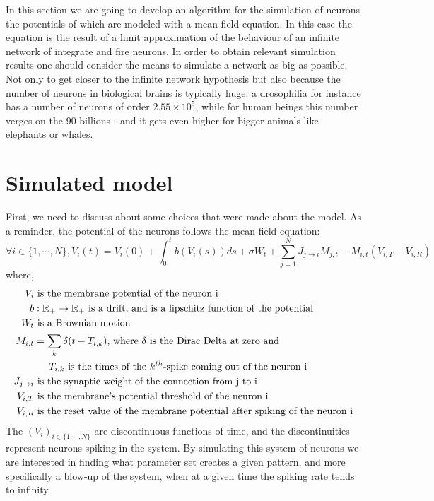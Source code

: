 	\indent In this section we are going to develop an algorithm for the simulation of neurons the potentials of which are modeled with a mean-field equation. In this case the equation is the result of a limit approximation of the behaviour of an infinite network of integrate and fire neurons. In order to obtain relevant simulation results one should consider the means to simulate a network as big as possible. Not only to get closer to the infinite network hypothesis but also because the number of neurons in biological brains is typically huge: a drosophilia for instance has a number of neurons of order $2.55\times10^5$, while for human beings this number verges on the 90 billions - and it gets even higher for bigger animals like elephants or whales.\\\indent
\section{Simulated model}\label{sec:model}
	\indent First, we need to discuss about some choices that were made about the model. As a reminder, the potential of the neurons follows the mean-field equation:\\\indent
	\begin{equation}
		\forall i\in\{1,\cdots,N\}, V_i(t)=V_i(0)+\int_0^t b(V_i(s))ds+\sigma W_t+\sum_{j=1}^NJ_{j\to i}M_{j,t}-M_{i,t}(V_{i,T}-V_{i,R})
	\end{equation}
	where,\begin{align*}
		V_i			& \text{ is the membrane potential of the neuron i}\\
		b			& :\mathbb{R}_{+}\to\mathbb{R}_+\text{ is a drift, and is a lipschitz function of the potential}\\
		W_t			& \text{ is a Brownian motion}\\
		M_{i,t}		& =\sum_k\delta(t-T_{i,k})\text{, where }\delta\text{ is the Dirac Delta at zero and}\\
					& \indent T_{i,k}\text{ is the times of the }k^{th}\text{-spike coming out of the neuron i}\\
		J_{j\to i}	& \text{ is the synaptic weight of the connection from j to i}\\
		V_{i,T}		& \text{ is the membrane's potential threshold of the neuron i}\\
		V_{i,R}		& \text{ is the reset value of the membrane potential after spiking of the neuron i}
	\end{align*}
	The $(V_i)_{i\in\{1,\cdots,N\}}$ are discontinuous functions of time, and the discontinuities represent neurons spiking in the system. By simulating this system of neurons we are interested in finding what parameter set creates a given pattern, and more specifically a blow-up of the system, when at a given time the spiking rate tends to infinity.\\\indent
